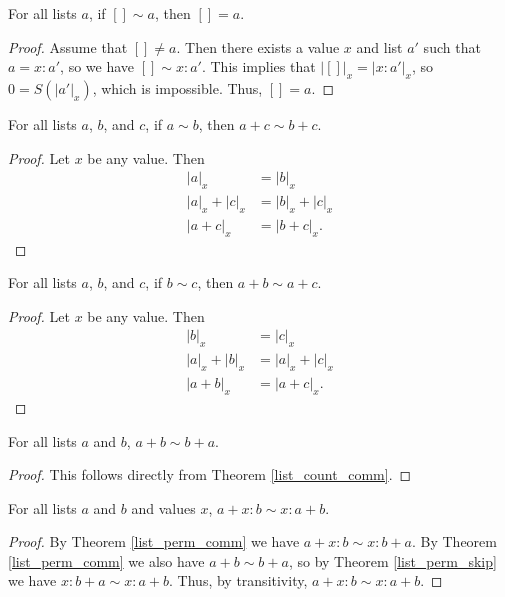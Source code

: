 \documentclass[../../math.tex]{subfiles}
\begin{document}
\begin{theorem} \label{list_perm_nil_eq}
    For all lists $a$, if $[] \sim a$, then $[] = a$.
\end{theorem}
\begin{proof}
    Assume that $[] \neq a$.  Then there exists a value $x$ and list $a'$ such
    that $a = x : a'$, so we have $[] \sim x : a'$.  This implies that $|[]|_x =
    |x : a'|_x$, so $0 = S(|a'|_x)$, which is impossible.  Thus, $[] = a$.
\end{proof}

\begin{theorem} \label{list_perm_lpart}
    For all lists $a$, $b$, and $c$, if $a \sim b$, then $a + c \sim b + c$.
\end{theorem}
\begin{proof}
    Let $x$ be any value.  Then
    \begin{align*}
        |a|_x &= |b|_x \\
        |a|_x + |c|_x &= |b|_x + |c|_x \\
        |a + c|_x &= |b + c|_x.
    \end{align*}
\end{proof}

\begin{theorem} \label{list_perm_rpart}
    For all lists $a$, $b$, and $c$, if $b \sim c$, then $a + b \sim a + c$.
\end{theorem}
\begin{proof}
    Let $x$ be any value.  Then
    \begin{align*}
        |b|_x &= |c|_x \\
        |a|_x + |b|_x &= |a|_x + |c|_x \\
        |a + b|_x &= |a + c|_x.
    \end{align*}
\end{proof}

\begin{theorem} \label{list_perm_comm}
    For all lists $a$ and $b$, $a + b \sim b + a$.
\end{theorem}
\begin{proof}
    This follows directly from Theorem \ref{list_count_comm}.
\end{proof}

\begin{theorem} \label{list_perm_split}
    For all lists $a$ and $b$ and values $x$, $a + x : b \sim x : a + b$.
\end{theorem}
\begin{proof}
    By Theorem \ref{list_perm_comm} we have $a + x : b \sim x : b + a$.  By
    Theorem \ref{list_perm_comm} we also have $a + b \sim b + a$, so by Theorem
    \ref{list_perm_skip} we have $x : b + a \sim x : a + b$.  Thus, by
    transitivity, $a + x : b \sim x : a + b$.
\end{proof}
\end{document}
